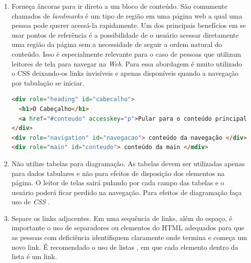 {{{\begin{enumerate}
\begin{itemize}
{\begin{lstlisting}[language=html,caption=Uso do atributo tabindex]
<label>
    Primeiro na lista de tabulação:<input type="text">
</label>
<div tabindex="0">
Próximo item na lista de tabulação, mesmo não sendo um elemento que receberia o foco natural
</div>
<div>Não será focado pois está sem o tabindex</div>
\end{lstlisting}}
        \item Adicione o atributo \lstinline{title} aos links, ele mostrará uma descrição do lugar pra onde o link leva, melhorando a navegação.
{\begin{lstlisting}[language=html,caption=usando o atributo title]
<a href="#" onclick="abrePopup()" onkeypress="abrePopup()" title="Abre uma janela pop-up com Javascript">Ver mais informações</a>
\end{lstlisting}}
    \end{itemize}
    \item Forneça âncoras para ir direto a um bloco de conteúdo. São comumente chamados de \textit{landmarks} é um tipo de região em uma página web a qual uma pessoa pode querer acessá-la rapidamente. Um dos principais benefícios em se usar pontos de referência é a possibilidade de o usuário acessar diretamente uma região da página sem a necessidade de seguir a ordem natural do conteúdo. Isso é especialmente relevante para o caso de pessoas que utilizam leitores de tela para navegar na \textit{Web}. Para essa abordagem é muito utilizado o CSS \cite{CSS} deixando-os links invisíveis e apenas disponíveis quando a navegação por tabulação se iniciar. 
{\begin{lstlisting}[language=html,caption=usando landmarks]
<div role="heading" id="cabecalho"> 
  <h1>O Cabeçalho</h1> 
  <a href="#conteudo" accesskey="p">Pular para o conteúdo principals</a> 
</div> 
<div role="navigation" id="navegacao"> conteúdo da navegação </div>
<div role="main" id="conteudo"> conteúdo da main </mdiv>
\end{lstlisting}}
    \item Não utilize tabelas para diagramação. As tabelas devem ser utilizadas apenas para dados tabulares e não para efeitos de disposição dos elementos na página. O leitor de telas sairá pulando por cada campo das tabelas e o usuário poderá ficar perdido na navegação. Para efeitos de diagramação faça uso de \textit{CSS} \cite{CSS}.
    \item Separe os links adjacentes. Em uma sequência de links, além do espaço, é importante o uso de separadores ou elementos do HTML \cite{HTML} adequados para que as pessoas com deficiência identifiquem claramente onde termina e começa um novo link. É recomendado o uso de listas , em que cada elemento dentro da lista é um link.

\end{enumerate}}}}

